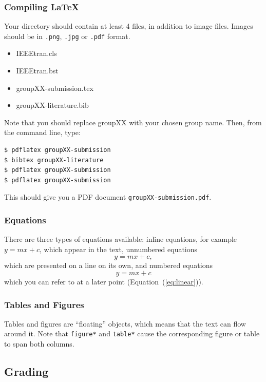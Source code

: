 \documentclass[10pt,conference,compsocconf]{IEEEtran}
\begin{document}
\subsubsection{Compiling \LaTeX{}}
Your directory should contain at least 4 files, in addition to image files. Images should be in \texttt{.png}, \texttt{.jpg} or \texttt{.pdf} format.
\begin{itemize}
\item IEEEtran.cls
\item IEEEtran.bst
\item groupXX-submission.tex
\item groupXX-literature.bib
\end{itemize}
Note that you should replace groupXX with your chosen group name. Then, from the command line, type:
\begin{verbatim}
$ pdflatex groupXX-submission
$ bibtex groupXX-literature
$ pdflatex groupXX-submission
$ pdflatex groupXX-submission
\end{verbatim}
This should give you a PDF document \texttt{groupXX-submission.pdf}.

\subsubsection{Equations}

There are three types of equations available: inline equations, for example $y=mx + c$, which appear in the text, unnumbered equations $$y=mx + c,$$ which are presented on a line on its own, and numbered equations
\begin{equation}
  \label{eq:linear}
  y = mx + c
\end{equation}
which you can refer to at a later point (Equation~(\ref{eq:linear})).

\subsubsection{Tables and Figures}

Tables and figures are ``floating'' objects, which means that the text can flow around it. Note that \texttt{figure*} and \texttt{table*} cause the corresponding figure or table to span both columns.


\subsection{Grading}
\end{document}
